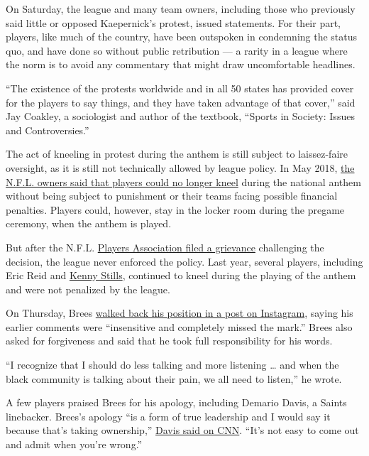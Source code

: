 On Saturday, the league and many team owners, including those who
previously said little or opposed Kaepernick's protest, issued
statements. For their part, players, like much of the country, have been
outspoken in condemning the status quo, and have done so without public
retribution --- a rarity in a league where the norm is to avoid any
commentary that might draw uncomfortable headlines.

``The existence of the protests worldwide and in all 50 states has
provided cover for the players to say things, and they have taken
advantage of that cover,'' said Jay Coakley, a sociologist and author of
the textbook, ``Sports in Society: Issues and Controversies.''

The act of kneeling in protest during the anthem is still subject to
laissez-faire oversight, as it is still not technically allowed by
league policy. In May 2018,
\href{https://www.nytimes3xbfgragh.onion/2018/05/23/sports/nfl-anthem-kneeling.html}{the
N.F.L. owners said that players could no longer kneel} during the
national anthem without being subject to punishment or their teams
facing possible financial penalties. Players could, however, stay in the
locker room during the pregame ceremony, when the anthem is played.

But after the N.F.L.
\href{https://www.nytimes3xbfgragh.onion/2018/07/10/sports/nfl-anthem.html}{Players
Association filed a grievance} challenging the decision, the league
never enforced the policy. Last year, several players, including Eric
Reid and
\href{https://www.nytimes3xbfgragh.onion/2018/09/07/sports/kenny-stills-national-anthem-protest.html}{Kenny
Stills}, continued to kneel during the playing of the anthem and were
not penalized by the league.

On Thursday, Brees
\href{https://www.instagram.com/p/CBA1P3gHpT_/?igshid=1qstwzxn87p2n}{walked
back his position in a post on Instagram}, saying his earlier comments
were ``insensitive and completely missed the mark.'' Brees also asked
for forgiveness and said that he took full responsibility for his words.

``I recognize that I should do less talking and more listening \ldots{}
and when the black community is talking about their pain, we all need to
listen,'' he wrote.

A few players praised Brees for his apology, including Demario Davis, a
Saints linebacker. Brees's apology ``is a form of true leadership and I
would say it because that's taking ownership,''
\href{https://twitter.com/AllisonLHedges/status/1268526582496444418}{Davis
said on CNN}. ``It's not easy to come out and admit when you're wrong.''

